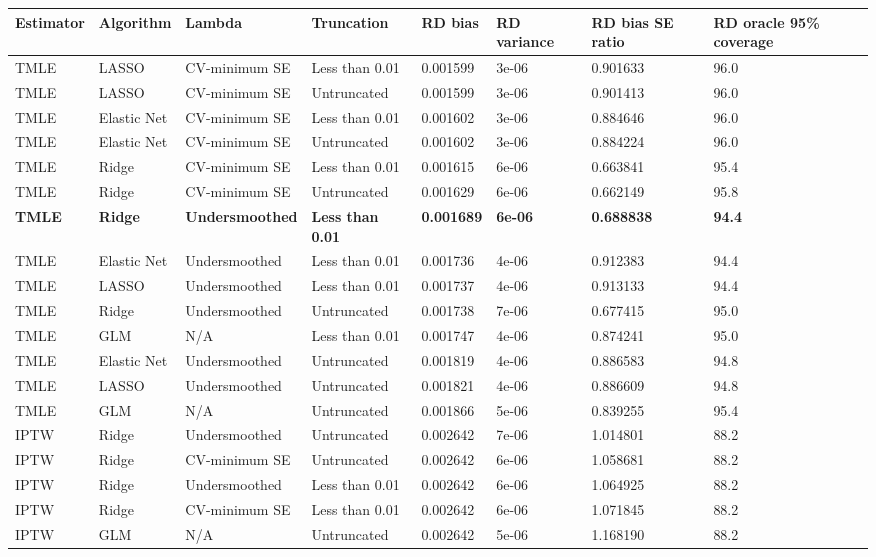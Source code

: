 
\begin{longtable}[l]{llllllll}
\toprule
Estimator & Algorithm & Lambda & Truncation & RD bias & RD variance & RD bias SE ratio & RD oracle 95\% coverage\\
\midrule
TMLE & LASSO & CV-minimum SE & Less than 0.01 & 0.001599 & 3e-06 & 0.901633 & 96.0\\
TMLE & LASSO & CV-minimum SE & Untruncated & 0.001599 & 3e-06 & 0.901413 & 96.0\\
TMLE & Elastic Net & CV-minimum SE & Less than 0.01 & 0.001602 & 3e-06 & 0.884646 & 96.0\\
TMLE & Elastic Net & CV-minimum SE & Untruncated & 0.001602 & 3e-06 & 0.884224 & 96.0\\
TMLE & Ridge & CV-minimum SE & Less than 0.01 & 0.001615 & 6e-06 & 0.663841 & 95.4\\
TMLE & Ridge & CV-minimum SE & Untruncated & 0.001629 & 6e-06 & 0.662149 & 95.8\\
\midrule
\textbf{TMLE} & \textbf{Ridge} & \textbf{Undersmoothed} & \textbf{Less than 0.01} & \textbf{0.001689} & \textbf{6e-06} & \textbf{0.688838} & \textbf{94.4}\\
\midrule
TMLE & Elastic Net & Undersmoothed & Less than 0.01 & 0.001736 & 4e-06 & 0.912383 & 94.4\\
TMLE & LASSO & Undersmoothed & Less than 0.01 & 0.001737 & 4e-06 & 0.913133 & 94.4\\
TMLE & Ridge & Undersmoothed & Untruncated & 0.001738 & 7e-06 & 0.677415 & 95.0\\
TMLE & GLM & N/A & Less than 0.01 & 0.001747 & 4e-06 & 0.874241 & 95.0\\
TMLE & Elastic Net & Undersmoothed & Untruncated & 0.001819 & 4e-06 & 0.886583 & 94.8\\
TMLE & LASSO & Undersmoothed & Untruncated & 0.001821 & 4e-06 & 0.886609 & 94.8\\
TMLE & GLM & N/A & Untruncated & 0.001866 & 5e-06 & 0.839255 & 95.4\\
IPTW & Ridge & Undersmoothed & Untruncated & 0.002642 & 7e-06 & 1.014801 & 88.2\\
IPTW & Ridge & CV-minimum SE & Untruncated & 0.002642 & 6e-06 & 1.058681 & 88.2\\
IPTW & Ridge & Undersmoothed & Less than 0.01 & 0.002642 & 6e-06 & 1.064925 & 88.2\\
IPTW & Ridge & CV-minimum SE & Less than 0.01 & 0.002642 & 6e-06 & 1.071845 & 88.2\\
IPTW & GLM & N/A & Untruncated & 0.002642 & 5e-06 & 1.168190 & 88.2\\

\end{longtable}
